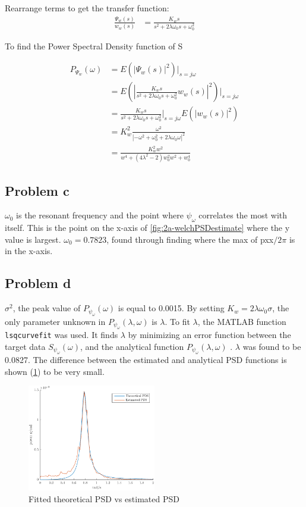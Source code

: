 Rearrange terms to get the transfer function:
\begin{align*}
    \frac{\Psi_w(s)}{w_w(s)} &= \frac{K_ws}{s^2 + 2\lambda\omega_0s + \omega^2_0}
\end{align*}

To find the Power Spectral Density function of S 

\begin{align*}
    P_{\Psi_w}(\omega) &= E(\left|\Psi_w(s)\right|^2)|_{s=j\omega} \\
    &= E\left(\left|\frac{K_ws}{s^2 + 2\lambda\omega_0s + \omega^2_0}w_w(s)\right|^2\right)|_{s=j\omega} \\
    &= \frac{K_ws}{s^2 + 2\lambda\omega_0s + \omega^2_0}|_{s=j\omega} E(\left|w_w(s)\right|^2) \\
    &= K_w^2\frac{\omega^2}{\left|-\omega^2+\omega^2_0+2\lambda\omega_0\omega\right|^2} \\
    &= \frac{K_w^2w^2}{w^4+(4\lambda^2-2)w_0^2w^2+w_0^4}
\end{align*}

\subsection{Problem c}
$\omega_0$ is the resonant 
frequency and the point where $\psi_\omega$ correlates the most with itself.  This is the point on the x-axis of \cref{fig:2a-welchPSDestimate} where the y value is largest.
$\omega_0 = 0.7823$, found through finding where the max of pxx$/2\pi$ is in the x-axis.  

\subsection{Problem d}
$\sigma^2$, the peak value of $P_{\psi_\omega}(\omega)$ is equal to 0.0015.
By setting $K_w = 2\lambda\omega_0\sigma$, the only parameter unknown in $P_{\psi_\omega}(\lambda, \omega)$ is $\lambda$. To fit $\lambda$, the MATLAB function \texttt{lsqcurvefit} was used. It finds $\lambda$ by minimizing an error
function between the target data $S_{\psi_\omega}(\omega)$, and the analytical function $P_{\psi_\omega}(\lambda, \omega)$ . $\lambda$ was found to be 0.0827. The difference between the estimated and analytical PSD functions is shown (\cref{fig:2d-fitted_theoretical_PSD_vs_estimated_PSD}) to be very small.

\begin{figure}[ht]
    \centering
    \includegraphics[width=0.5\textwidth]{images/2d-fitted_theoretical_PSD_vs_estimated_PSD}
    \caption{Fitted theoretical PSD vs estimated PSD}
    \label{fig:2d-fitted_theoretical_PSD_vs_estimated_PSD}
\end{figure}
